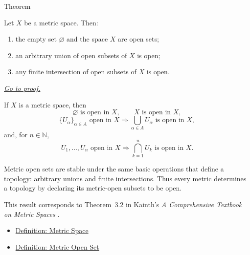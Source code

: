 \begin{theorembox}{Theorem}
\begin{theorem}
\label{thm:metric-open-set-closure-properties}
Let \(X\) be a metric space.  Then:
\begin{enumerate}
  \item the empty set \(\varnothing\) and the space \(X\) are open sets;
  \item an arbitrary union of open subsets of \(X\) is open;
  \item any finite intersection of open subsets of \(X\) is open.
\end{enumerate}

\smallskip
\noindent
\hyperref[prf:metric-open-set-closure-properties]{\textit{Go to proof.}}
\end{theorem}
\end{theorembox}

\begin{remark*}
If \(X\) is a metric space, then
\[
\varnothing\text{ is open in }X,
\qquad
X\text{ is open in }X,
\]
\[
\{U_\alpha\}_{\alpha\in A}\text{ open in }X
\Longrightarrow
\bigcup_{\alpha\in A}U_\alpha\text{ is open in }X,
\]
and, for \(n\in\mathbb{N}\),
\[
U_1,\ldots,U_n\text{ open in }X
\Longrightarrow
\bigcap_{k=1}^{n}U_k\text{ is open in }X.
\]
\end{remark*}

\begin{remark*}[Interpretation]
Metric open sets are stable under the same basic operations that define a
topology: arbitrary unions and finite intersections.  Thus every metric
determines a topology by declaring its metric-open subsets to be open.
\end{remark*}

\begin{remark*}
This result corresponds to Theorem~3.2 in Kainth's
\emph{A Comprehensive Textbook on Metric Spaces}
\cite{KainthComprehensiveMetricSpaces2023}.
\end{remark*}

\begin{dependencies}
\begin{itemize}
  \item \hyperref[def:metric-space]{Definition: Metric Space}
  \item \hyperref[def:metric-open-set]{Definition: Metric Open Set}
\end{itemize}
\end{dependencies}

